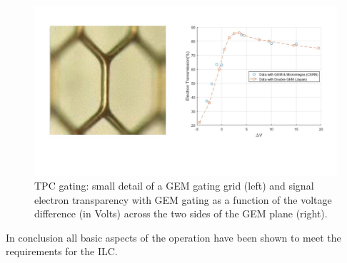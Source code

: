\begin{figure}[t!]
\centering
\includegraphics[width=1.0\hsize]{Detector/fig/TPC_gating.jpg}
\caption{TPC gating: small detail of a GEM gating grid (left) and signal electron transparency with GEM gating as a function of the voltage difference (in Volts) across the two sides of the GEM plane (right).} 
\label{fig:det:TPC_gating}
\end{figure}

In conclusion all basic aspects of the operation have been shown to meet the requirements for the ILC. 
\vspace{3cm}